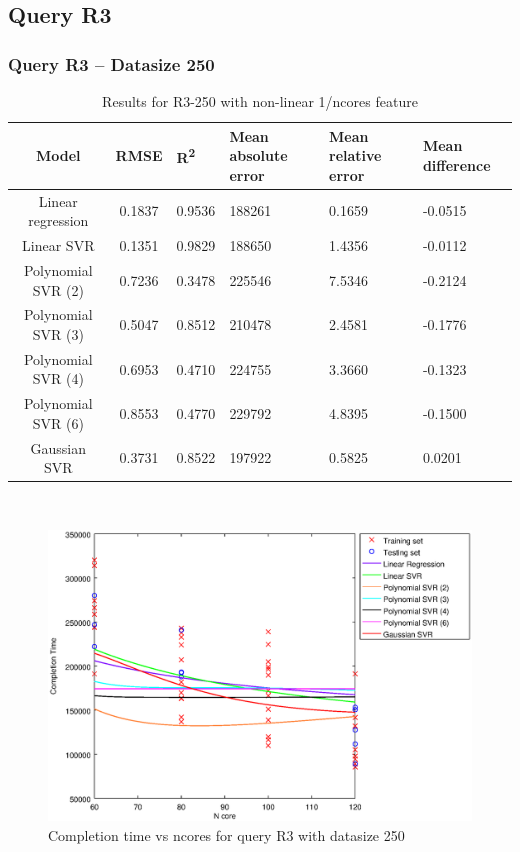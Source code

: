 \documentclass[a4paper,11pt]{article}
\begin{document}
\newpage
\subsection{Query R3}
\subsubsection{Query R3 -- Datasize 250}
\begin{table}[H]
	\centering
	\begin{adjustbox}{center}
		\begin{tabular}{c | c M{1.2cm} M{2.5cm} M{2.5cm} M{1.8cm}}
			Model & RMSE & R\textsuperscript{2} & Mean absolute error & Mean relative error & Mean difference \tabularnewline
			\hline
			Linear regression & 0.1837 & 0.9536 & 188261 & 0.1659 & -0.0515 \\
			Linear SVR & 0.1351 & 0.9829 & 188650 & 1.4356 & -0.0112 \\
			Polynomial SVR (2) & 0.7236 & 0.3478 & 225546 & 7.5346 & -0.2124 \\
			Polynomial SVR (3) & 0.5047 & 0.8512 & 210478 & 2.4581 & -0.1776 \\
			Polynomial SVR (4) & 0.6953 & 0.4710 & 224755 & 3.3660 & -0.1323 \\
			Polynomial SVR (6) & 0.8553 & 0.4770 & 229792 & 4.8395 & -0.1500 \\
			Gaussian SVR & 0.3731 & 0.8522 & 197922 & 0.5825 & 0.0201 \\
		\end{tabular}
	\end{adjustbox}
	\\
	\caption{Results for R3-250 with non-linear 1/ncores feature}
	\label{table_R3_prediction_all}
\end{table}

\begin {figure}[hbtp]
\centering
\includegraphics[width=\textwidth]{output/R3_250_NO_72_90_1_OVER_NCORES/plot_R3_250.eps}
\caption {Completion time vs ncores for query R3 with datasize 250}
\end {figure}
\end{document}
